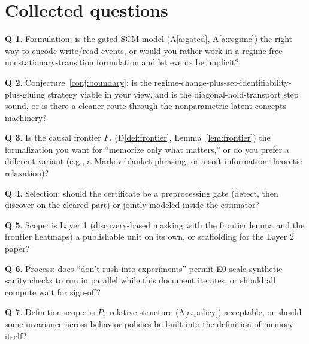 \documentclass[11pt]{article}
\theoremstyle{plain}
\theoremstyle{definition}
\newtheorem{questionx}{Q}
\begin{document}
\section{Collected questions}\label{sec:questions}

\begin{questionx}
Formulation: is the gated-SCM model (A\ref{a:gated}, A\ref{a:regime}) the right way to encode write/read events, or would you rather work in a regime-free nonstationary-transition formulation and let events be implicit?
\end{questionx}
\begin{questionx}
Conjecture~\ref{conj:boundary}: is the regime-change-plus-set-identifiability-plus-gluing strategy viable in your view, and is the diagonal-hold-transport step sound, or is there a cleaner route through the nonparametric latent-concepts machinery?
\end{questionx}
\begin{questionx}
Is the causal frontier $F_t$ (D\ref{def:frontier}, Lemma~\ref{lem:frontier}) the formalization you want for ``memorize only what matters,'' or do you prefer a different variant (e.g., a Markov-blanket phrasing, or a soft information-theoretic relaxation)?
\end{questionx}
\begin{questionx}
Selection: should the certificate be a preprocessing gate (detect, then discover on the cleared part) or jointly modeled inside the estimator?
\end{questionx}
\begin{questionx}
Scope: is Layer 1 (discovery-based masking with the frontier lemma and the frontier heatmaps) a publishable unit on its own, or scaffolding for the Layer 2 paper?
\end{questionx}
\begin{questionx}
Process: does ``don't rush into experiments'' permit E0-scale synthetic sanity checks to run in parallel while this document iterates, or should all compute wait for sign-off?
\end{questionx}
\begin{questionx}
Definition scope: is $P_\pi$-relative structure (A\ref{a:policy}) acceptable, or should some invariance across behavior policies be built into the definition of memory itself?
\end{questionx}
\end{document}
